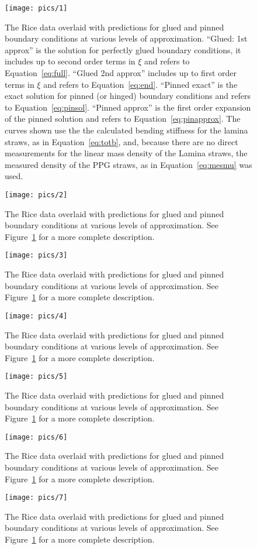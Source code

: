 \documentclass[twoside]{article}
\begin{document}
\begin{multicols}{2}
\label{sec:plots}
\begin{figure}[H]
	\texttt{[image: pics/1]}
	\caption{The Rice data overlaid with predictions for glued and pinned boundary conditions at various levels of approximation. ``Glued: 1st approx'' is the solution for perfectly glued boundary conditions, it includes up to second order terms in $\xi$ and refers to Equation~\ref{eq:full}. ``Glued 2nd approx'' includes up to first order terms in $\xi$ and refers to Equation~\ref{eq:end}. ``Pinned exact'' is the exact solution for pinned (or hinged) boundary conditions and refers to Equation~\ref{eq:pinsol}. ``Pinned approx'' is the first order expansion of the pinned solution and refers to Equation~\ref{eq:pinapprox}. The curves shown use the the calculated bending stiffness for the lamina straws, as in Equation~\ref{eq:totb}, and, because there are no direct measurements for the linear mass density of the Lamina straws, the measured density of the PPG straws, as in Equation~\ref{eq:mesmu} was used.
	}
	\label{fig:1}
\end{figure}
\begin{figure}[H]
	\texttt{[image: pics/2]}
	\caption{The Rice data overlaid with predictions for glued and pinned boundary conditions at various levels of approximation. See Figure~\ref{fig:1} for a more complete description. 
	}
	\label{fig:2}
\end{figure}
\begin{figure}[H]
	\texttt{[image: pics/3]}
	\caption{The Rice data overlaid with predictions for glued and pinned boundary conditions at various levels of approximation. See Figure~\ref{fig:1} for a more complete description. 
	}
	\label{fig:3}
\end{figure}
\begin{figure}[H]
	\texttt{[image: pics/4]}
	\caption{The Rice data overlaid with predictions for glued and pinned boundary conditions at various levels of approximation. See Figure~\ref{fig:1} for a more complete description. 
	}
	\label{fig:4}
\end{figure}
\begin{figure}[H]
	\texttt{[image: pics/5]}
	\caption{The Rice data overlaid with predictions for glued and pinned boundary conditions at various levels of approximation. See Figure~\ref{fig:1} for a more complete description. 
	}
	\label{fig:5}
\end{figure}
\begin{figure}[H]
	\texttt{[image: pics/6]}
	\caption{The Rice data overlaid with predictions for glued and pinned boundary conditions at various levels of approximation. See Figure~\ref{fig:1} for a more complete description. 
	}
	\label{fig:6}
\end{figure}
\begin{figure}[H]
	\texttt{[image: pics/7]}
	\caption{The Rice data overlaid with predictions for glued and pinned boundary conditions at various levels of approximation. See Figure~\ref{fig:1} for a more complete description. 
	}
	\label{fig:7}
\end{figure}




\end{multicols}
\end{document}
